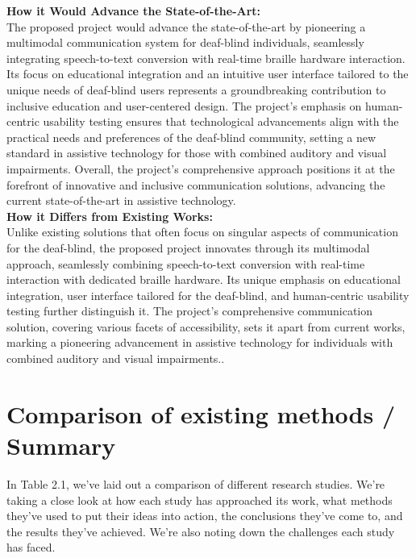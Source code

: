 \documentclass[12pt,a4paper]{report}
\begin{document}
\noindent
\textbf{How it Would Advance the State-of-the-Art:} \\
The proposed project would advance the state-of-the-art by pioneering a multimodal communication system for deaf-blind individuals, seamlessly integrating speech-to-text conversion with real-time braille hardware interaction. Its focus on educational integration and an intuitive user interface tailored to the unique needs of deaf-blind users represents a groundbreaking contribution to inclusive education and user-centered design. The project's emphasis on human-centric usability testing ensures that technological advancements align with the practical needs and preferences of the deaf-blind community, setting a new standard in assistive technology for those with combined auditory and visual impairments. Overall, the project's comprehensive approach positions it at the forefront of innovative and inclusive communication solutions, advancing the current state-of-the-art in assistive technology. \\

\noindent
\textbf{How it Differs from Existing Works:} \\
Unlike existing solutions that often focus on singular aspects of communication for the deaf-blind, the proposed project innovates through its multimodal approach, seamlessly combining speech-to-text conversion with real-time interaction with dedicated braille hardware. Its unique emphasis on educational integration, user interface tailored for the deaf-blind, and human-centric usability testing further distinguish it. The project's comprehensive communication solution, covering various facets of accessibility, sets it apart from current works, marking a pioneering advancement in assistive technology for individuals with combined auditory and visual impairments.. 
\section{Comparison of existing methods / Summary}
In Table 2.1, we've laid out a comparison of different research studies. We're taking a close look at how each study has approached its work, what methods they've used to put their ideas into action, the conclusions they've come to, and the results they've achieved. We're also noting down the challenges each study has faced.
\end{document}
